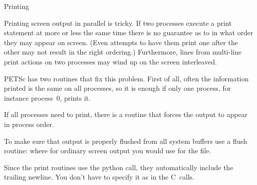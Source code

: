  {Printing}

Printing screen output in parallel is tricky. If two processes execute
a print statement at more or less the same time there is no guarantee
as to in what order they may appear on screen. (Even attempts to have
them print one after the other may not result in the right ordering.)
Furthermore, lines from multi-line print actions on two processes may
wind up on the screen interleaved.

PETSc has two routines that fix this problem. First of all, often the
information printed is the same on all processes, so it is enough if
only one process, for instance process~0, prints it.
%

If all processes need to print, there is a routine that forces the
output to appear in process order.
%

To make sure that output is properly flushed from all system buffers
use a flush routine:
%
%
where for ordinary screen output you would use  for the file.

\begin{pythonnote}
  Since the print routines use the python  call, they
  automatically include the trailing newline. You don't have to
  specify it as in the C~calls.
\end{pythonnote}

